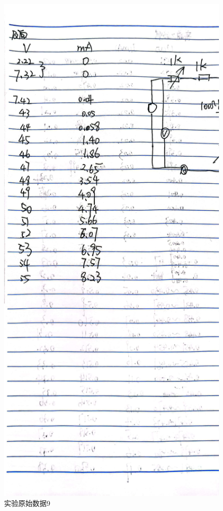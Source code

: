 \documentclass{ctexart}
\begin{document}
\begin{figure}[H]
  \centering
  \includegraphics[width=1\textwidth,height=0.8\textheight]{wenyafanxiang.jpg}
  \caption{实验原始数据9}\label{wenyafanxiang}
\end{figure}
\newpage
\end{document}
